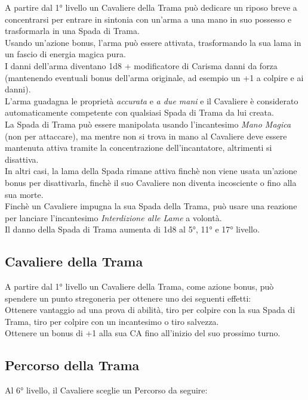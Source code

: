 A partire dal 1° livello un Cavaliere della Trama può dedicare un riposo breve a concentrarsi per entrare in sintonia con un'arma a una mano in suo possesso e trasformarla in una Spada di Trama. \\ Usando un'azione bonus, l'arma può essere attivata, trasformando la sua lama in un fascio di energia magica pura. \\ I danni dell'arma diventano 1d8 + modificatore di Carisma danni da forza (mantenendo eventuali bonus dell'arma originale, ad esempio un +1 a colpire e ai danni). \\ L'arma guadagna le proprietà \textit{accurata} e \textit{a due mani} e il Cavaliere è considerato automaticamente competente con qualsiasi Spada di Trama da lui creata. \\ La Spada di Trama può essere manipolata usando l'incantesimo \textit{Mano Magica} (non per attaccare), ma mentre non si trova in mano al Cavaliere deve essere mantenuta attiva tramite la concentrazione dell'incantatore, altrimenti si disattiva. \\ In altri casi, la lama della Spada rimane attiva finchè non viene usata un'azione bonus per disattivarla, finchè il suo Cavaliere non diventa incosciente o fino alla sua morte. \\ Finchè un Cavaliere impugna la sua Spada della Trama, può usare una reazione per lanciare l'incantesimo \textit{Interdizione alle Lame} a volontà. \\ Il danno della Spada di Trama aumenta di 1d8 al 5°, 11° e 17° livello.

\subsection{Cavaliere della Trama}

A partire dal 1° livello un Cavaliere della Trama, come azione bonus, può spendere un punto stregoneria per ottenere uno dei seguenti effetti: \\
Ottenere vantaggio ad una prova di abilità, tiro per colpire con la sua Spada di Trama, tiro per colpire con un incantesimo o tiro salvezza. \\
Ottenere un bonus di +1 alla sua CA fino all'inizio del suo prossimo turno.

\subsection{Percorso della Trama}

Al 6° livello, il Cavaliere sceglie un Percorso da seguire:
